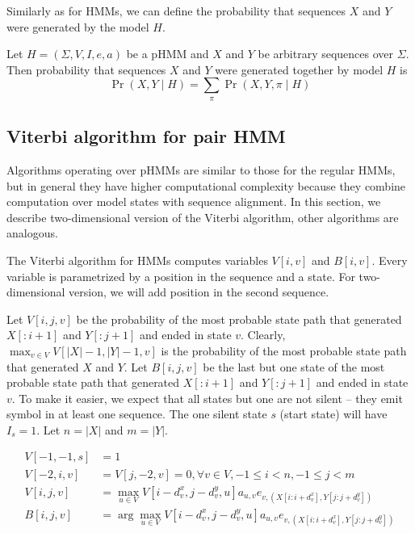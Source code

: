 Similarly as for HMMs, we can define the probability that sequences $X$ and $Y$ were
generated by the model $H$.

\begin{definition}
Let $H=(\Sigma,V,I,e,a)$ be a pHMM and  $X$ and $Y$ be arbitrary sequences over
$\Sigma$. Then probability that sequences $X$ and $Y$ were generated together by
model $H$ is 
\begin{equation}
\Pr\left(X,Y\mid H\right)=\sum_{\pi}\Pr\left(X,Y,\pi\mid H\right)
\end{equation}
\end{definition}


\subsection{Viterbi algorithm for pair HMM}
\label{SECTION:PAIRHMMVITERBI}
Algorithms operating over pHMMs are similar to those for the regular HMMs, but
in general they have higher computational complexity because they combine
computation  over model states with sequence alignment.  In this section, we
describe two-dimensional version of the Viterbi algorithm, other algorithms are
analogous.

The Viterbi algorithm for HMMs computes variables $V[i,v]$ and $B[i,v]$. Every
variable is parametrized by a position in the sequence and a state. For
two-dimensional version, we will add position in the second sequence.

Let $V[i,j,v]$ be the probability of the most probable state path that generated
$X[:i+1]$ and $Y[:j+1]$ and ended in state $v$. Clearly, $\max_{v\in
V}V[|X|-1,|Y|-1,v]$ is the probability of the most probable state path that
generated $X$ and $Y$. Let $B[i,j,v]$ be the last but one state of the most
probable state path that generated $X[:i+1]$ and $Y[:j+1]$ and ended in state
$v$. To make it easier, we expect that all states but one are not silent -- they emit
symbol in at least one sequence. The one silent state $s$ (start state) will have $I_s=1$.
 Let $n=|X|$ and $m=|Y|$.


\begin{align}
V[-1,-1,s] &= 1\\
V[-2,i,v] &= V[j,-2,v] = 0, \forall v\in V,-1 \leq i < n, -1\leq j < m\\
V[i,j,v] &= \max_{u\in
V}V[i-d^x_{v},j-d^y_v,u]a_{u,v}e_{v,(X[i:i+d^x_v],Y[j:j+d^y_v])}\label{EQUATION:2DVITERBIF}\\
B[i,j,v] &= \arg\max_{u\in
V}V[i-d^x_{v},j-d^y_v,u]a_{u,v}e_{v,(X[i:i+d^x_v],Y[j:j+d^y_v])}\label{EQUATION:2DVITERBIB}
\end{align}

